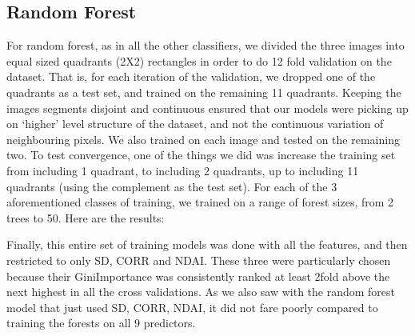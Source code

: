 \documentclass{article}\usepackage[]{graphicx}\usepackage[]{color}
\begin{document}
\subsection{Random Forest}

For random forest, as in all the other classifiers, we divided the three images into equal sized quadrants (2X2) rectangles in order to do 12 fold validation on the dataset.  That is, for each iteration of the validation, we dropped one of the quadrants as a test set, and trained on the remaining 11 quadrants.  Keeping the images segments disjoint and continuous ensured that our models were picking up on `higher' level structure of the dataset, and not the continuous variation of neighbouring pixels.  We also trained on each image and tested on the remaining two.  To test convergence, one of the things we did was increase the training set from including 1 quadrant, to including 2 quadrants, up to including 11 quadrants (using the complement as the test set).  For each of the 3 aforementioned classes of training, we trained on a range of forest sizes, from 2 trees to 50.     Here are the results: 

Finally, this entire set of training models was done with all the features, and then restricted to only SD, CORR and NDAI.  These three were particularly chosen because their GiniImportance was consistently ranked at least 2fold above the next highest in all the cross validations. As we also saw with the random forest model that just used SD, CORR, NDAI, it did not fare poorly compared to training the forests on all 9 predictors.  
\end{document}
